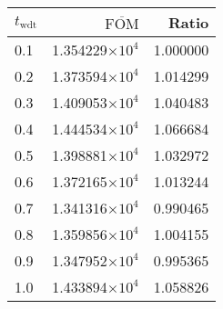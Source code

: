 \begin{tabular}{lrr}
\toprule
$t_{\mathrm{wdt}}$ & $\overline{\mathrm{FOM}}$ &    Ratio \\
\midrule
               0.1 &   1.354229$\times 10^{4}$ & 1.000000 \\
               0.2 &   1.373594$\times 10^{4}$ & 1.014299 \\
               0.3 &   1.409053$\times 10^{4}$ & 1.040483 \\
               0.4 &   1.444534$\times 10^{4}$ & 1.066684 \\
               0.5 &   1.398881$\times 10^{4}$ & 1.032972 \\
               0.6 &   1.372165$\times 10^{4}$ & 1.013244 \\
               0.7 &   1.341316$\times 10^{4}$ & 0.990465 \\
               0.8 &   1.359856$\times 10^{4}$ & 1.004155 \\
               0.9 &   1.347952$\times 10^{4}$ & 0.995365 \\
               1.0 &   1.433894$\times 10^{4}$ & 1.058826 \\
\bottomrule
\end{tabular}
